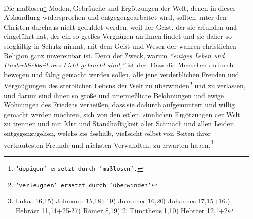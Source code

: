 Die maßlosen\footnote{\texttt{'üppigen' ersetzt durch 'maßlosen'.}}
Moden, Gebräuche und Ergötzungen der Welt, denen in dieser
Abhandlung widersprochen und entgegengearbeitet wird, sollten unter den Christen
durchaus nicht geduldet werden, weil der Geist, der sie erfunden und eingeführt
hat, der ein so großes Vergnügen an ihnen findet und sie daher so sorgfältig in
Schutz nimmt, mit dem Geist und Wesen der wahren christlichen Religion ganz
unvereinbar ist. Denn der Zweck, warum
\textit{"`ewiges Leben und Unsterblichkeit ans
Licht gebracht sind,"'} ist der: Dass die Menschen dadurch bewogen und fähig
gemacht werden sollen, alle jene verderblichen Freuden und Vergnügungen des
sterblichen Lebens der Welt zu überwinden\footnote{\texttt{'verleugnen' ersetzt
durch 'überwinden'}}
und zu verlassen, und darum sind ihnen
so große und unermeßliche Belohnungen und ewige
Wohnungen des Friedens
verheißen, dass sie dadurch aufgemuntert und willig gemacht werden möchten, sich
von den eitlen, sinnlichen Ergötzungen der Welt zu trennen und mit Mut und
Standhaftigkeit aller Schmach und allen Leiden
entgegenzugehen, welche sie
deshalb, vielleicht selbst von Seiten ihrer vertrautesten Freunde und nächsten
Verwandten, zu erwarten haben.\footnote{
Lukas 16,15)
Johannes 15,18+19)
Johannes 16,20)
Johannes 17,15+16.)
Hebräer 11,14+25-27)
Römer 8,19)
2. Timotheus 1,10)
Hebräer 12,1+2 }


\medskip

